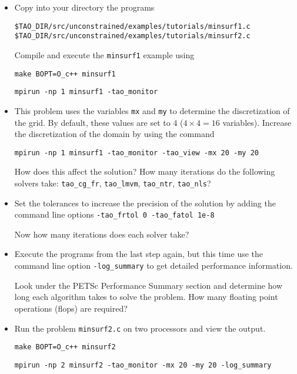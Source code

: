 \documentclass[11pt]{article}
\begin{document}
\begin{enumerate}
\begin{itemize}

\item
Copy into your directory the programs
\begin{alltt}
\$TAO_DIR/src/unconstrained/examples/tutorials/minsurf1.c
\$TAO_DIR/src/unconstrained/examples/tutorials/minsurf2.c

\end{alltt}
    
Compile and execute the \texttt{minsurf1} example using
    
\quad \texttt{make BOPT=O\_c++ minsurf1}

\quad \texttt{mpirun -np 1 minsurf1 -tao\_monitor}

\item
This problem uses the variables {\tt mx} and {\tt my} to determine
the discretization of the grid.  By default, these values are set to
$4$ ($4 \times 4 = 16$ variables). Increase the discretization of the 
domain by using the command 

\quad \texttt{mpirun -np 1 minsurf1 -tao\_monitor -tao\_view -mx 20 -my 20}

How does this affect the solution?
How many iterations do the following solvers take: \texttt{tao\_cg\_fr},
\texttt{tao\_lmvm}, \texttt{tao\_ntr}, \texttt{tao\_nls}?

\item
Set the tolerances to increase the precision of the solution by adding the
command line options \texttt{-tao\_frtol 0 -tao\_fatol 1e-8}

Now how many iterations does each solver take?

\item
Execute the programs from the last step again, but this time use the command line option 
\texttt{-log\_summary} to get detailed performance information.

Look under the PETSc Performance Summary section and determine how long
each algorithm takes to solve the problem. How many floating point operations (flops) are required? 


\item
Run the problem \texttt{minsurf2.c} on two processors and view the output.

\quad \texttt{make BOPT=O\_c++ minsurf2}

\quad \texttt{mpirun -np 2 minsurf2 -tao\_monitor -mx 20 -my 20 -log\_summary}

\end{itemize}

\end{enumerate}
\end{document}
